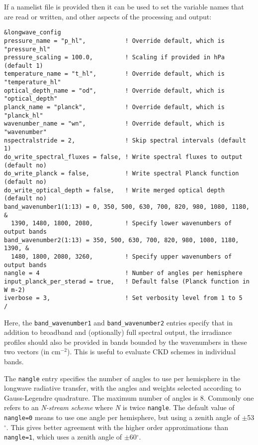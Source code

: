 \documentclass[twoside]{article}
\def\codesize{\small}
\def\code#1{{\codesize\texttt{#1}}}
\begin{document}
If a namelist file is provided then it can be used to set the variable
names that are read or written, and other aspects of the processing
and output:
%
\begin{verbatim}
&longwave_config
pressure_name = "p_hl",           ! Override default, which is "pressure_hl" 
pressure_scaling = 100.0,         ! Scaling if provided in hPa (default 1)
temperature_name = "t_hl",        ! Override default, which is "temperature_hl"
optical_depth_name = "od",        ! Override default, which is "optical_depth"
planck_name = "planck",           ! Override default, which is "planck_hl"
wavenumber_name = "wn",           ! Override default, which is "wavenumber"
nspectralstride = 2,              ! Skip spectral intervals (default 1)
do_write_spectral_fluxes = false, ! Write spectral fluxes to output (default no)
do_write_planck = false,          ! Write spectral Planck function (default no)
do_write_optical_depth = false,   ! Write merged optical depth (default no)
band_wavenumber1(1:13) = 0, 350, 500, 630, 700, 820, 980, 1080, 1180, &
  1390, 1480, 1800, 2080,         ! Specify lower wavenumbers of output bands
band_wavenumber2(1:13) = 350, 500, 630, 700, 820, 980, 1080, 1180, 1390, &
  1480, 1800, 2080, 3260,         ! Specify upper wavenumbers of output bands
nangle = 4                        ! Number of angles per hemisphere
input_planck_per_sterad = true,   ! Default false (Planck function in W m-2)
iverbose = 3,                     ! Set verbosity level from 1 to 5
/
\end{verbatim}
Here, the \code{band\_wavenumber1} and \code{band\_wavenumber2}
entries specify that in addition to broadband and (optionally) full
spectral output, the irradiance profiles should also be provided in
bands bounded by the wavenumbers in these two vectors (in
cm$^{-2}$). This is useful to evaluate CKD schemes in individual
bands.

The \code{nangle} entry specifies the number of angles to use per
hemisphere in the longwave radiative transfer, with the angles and
weights selected according to Gauss-Legendre quadrature.  The maximum
number of angles is 8.  Commonly one refers to an \emph{N-stream
  scheme} where \emph{N} is twice \code{nangle}.  The default value of
\code{nangle=0} means to use one angle per hemisphere, but using a
zenith angle of $\pm$53$^\circ$.  This gives better agreement with the
higher order approximations than \code{nangle=1}, which uses a zenith
angle of $\pm$60$^\circ$.
\end{document}
